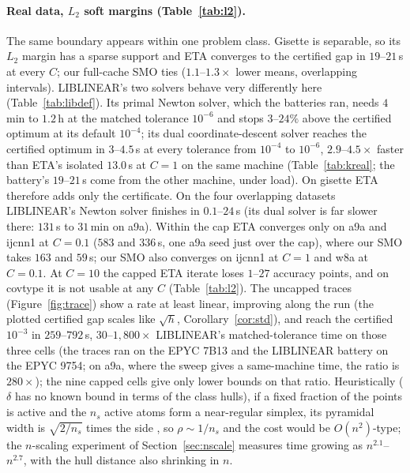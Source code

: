 \documentclass[pdflatex,sn-apa]{sn-jnl}%
\theoremstyle{thmstyleone}
\theoremstyle{thmstyletwo}
\begin{document}
\paragraph{Real data, $L_2$ soft margins (Table~\ref{tab:l2}).}
The same boundary appears within one problem class. Gisette is
separable, so its $L_2$ margin has a sparse support and ETA converges to
the certified gap in $19$--$21$\,s at every $C$; our full-cache SMO ties
($1.1$--$1.3\times$ lower means, overlapping intervals). LIBLINEAR's two solvers behave very
differently here (Table~\ref{tab:libdef}). Its primal Newton solver,
which the batteries ran, needs $4$\,min to $1.2$\,h at the matched
tolerance $10^{-6}$ and stops $3$--$24\%$ above the certified optimum at
its default $10^{-4}$; its dual coordinate-descent solver reaches the certified
optimum in $3$--$4.5$\,s at every tolerance from $10^{-4}$ to $10^{-6}$,
$2.9$--$4.5\times$ faster than ETA's isolated $13.0$\,s at $C{=}1$ on
the same machine (Table~\ref{tab:kreal}; the battery's $19$--$21$\,s
come from the other machine, under load). On gisette ETA therefore adds only
the certificate. On the four overlapping datasets LIBLINEAR's Newton
solver finishes in $0.1$--$24$\,s (its dual solver is far slower there:
$131$\,s to $31$\,min on a9a). Within the cap ETA converges only on
a9a and ijcnn1 at $C{=}0.1$ ($583$ and $336$\,s, one a9a seed just over
the cap), where our SMO takes $163$ and $59$\,s; our SMO also converges
on ijcnn1 at $C{=}1$ and w8a at $C{=}0.1$. At $C{=}10$ the capped ETA
iterate loses $1$--$27$ accuracy points, and on covtype it is not usable at any $C$ (Table~\ref{tab:l2}). The uncapped traces
(Figure~\ref{fig:trace}) show a rate at least linear, improving along
the run (the plotted certified gap scales like $\sqrt h$,
Corollary~\ref{cor:std}), and reach the certified $10^{-3}$ in
$259$--$792$\,s, $30$--$1{,}800\times$ LIBLINEAR's matched-tolerance time on
those three cells (the traces ran on the EPYC 7B13 and the LIBLINEAR
battery on the EPYC 9754; on a9a, where the sweep gives a same-machine
time, the ratio is $280\times$); the nine capped cells give only lower bounds on
that ratio.
Heuristically ($\delta$ has no known bound in terms of the class
hulls), if a fixed fraction of the points is active and the $n_s$ active
atoms form a near-regular simplex, its pyramidal width is $\sqrt{2/n_s}$
times the side \citep{lj2015}, so
$\rho\sim1/n_s$ and the cost would be $O(n^2)$-type; the $n$-scaling
experiment of Section~\ref{sec:nscale} measures time growing as
$n^{2.1}$--$n^{2.7}$, with the hull distance also shrinking in $n$.
\end{document}
